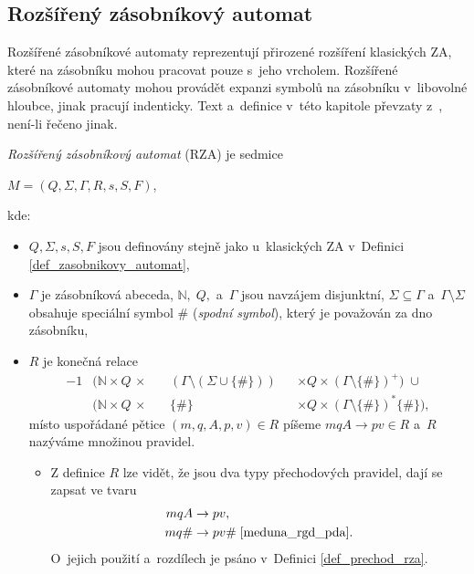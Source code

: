 \subsection*{Rozšířený zásobníkový automat}\label{kap_rozsireny_ZA}
Rozšířené zásobníkové automaty reprezentují přirozené rozšíření klasických ZA, které na zásobníku mohou pracovat pouze s~jeho vrcholem.
Rozšířené zásobníkové automaty mohou provádět expanzi symbolů na zásobníku v~libovolné hloubce, jinak pracují indenticky.
Text a~definice v~této kapitole převzaty z~\cite{meduna2023automata, meduna_zemek_2014}, není-li řečeno jinak.

\begin{definition}\label{def_rza}
    \emph{Rozšířený zásobníkový automat} (RZA) je sedmice
    \begin{center}
        $M = (Q, \Sigma, \Gamma, R, s, S, F)$,
    \end{center}
    kde:
    \begin{itemize}
        \item $Q, \Sigma, s, S, F$ jsou definovány stejně jako u~klasických ZA v~Definici \ref{def_zasobnikovy_automat},
        \item $\Gamma$ je zásobníková abeceda, $\mathbb{N},\; Q,$ a~$\Gamma$ jsou navzájem disjunktní, $\Sigma \subseteq \Gamma$ a~$\Gamma \setminus \Sigma$ obsahuje speciální symbol $\#$ (\emph{spodní symbol}), který je považován za dno zásobníku, 
        \item $R$ je konečná relace
        \begin{alignat*}{-1}
             &(\mathbb{N} \times Q \,\times \,&& (\Gamma \setminus (\Sigma \cup \{\#\})) &&\times Q \times (\Gamma \setminus \{\#\})^+) \;\cup \\
             &(\mathbb{N} \times Q \,\times \,&& \{\#\} &&\times Q \times (\Gamma \setminus \{\#\})^*\{\#\}),
        \end{alignat*}
        místo uspořádané pětice $(m, q, A, p, v) \in R$ píšeme $mqA \rightarrow pv \in R$ a~$R$ nazýváme množinou pravidel.
        \begin{itemize}[label=$\circ$]
            \item Z definice $R$ lze vidět, že jsou dva typy přechodových pravidel, dají se zapsat ve tvaru
            \begin{align*}
                mqA  &\rightarrow pv,\\
                mq\# &\rightarrow pv\# \; \cite{meduna_rgd_pda}.
            \end{align*}
            O~jejich použití a~rozdílech je psáno v~Definici \ref{def_prechod_rza}.
        \end{itemize}
    \end{itemize}
\end{definition}

